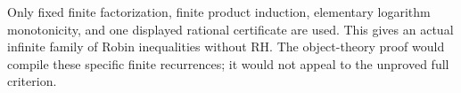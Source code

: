 \documentclass[11pt,a4paper]{article}
\theoremstyle{definition}
\begin{document}
Only fixed finite factorization, finite product induction, elementary
logarithm monotonicity, and one displayed rational certificate are used.
This gives an actual infinite family of Robin inequalities without RH.
The object-theory proof would compile these specific finite recurrences;
it would not appeal to the unproved full criterion.






\end{document}
